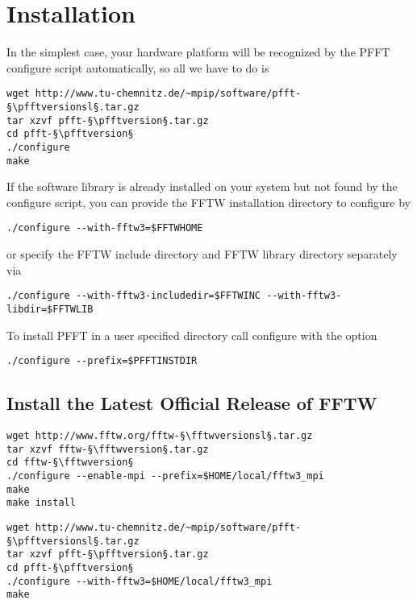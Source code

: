 \chapter{Installation}\label{chap:inst}




In the simplest case, your hardware platform will be recognized by the PFFT configure script automatically,
so all we have to do is
\begin{lstlisting}[escapechar=§]
wget http://www.tu-chemnitz.de/~mpip/software/pfft-§\pfftversionsl§.tar.gz
tar xzvf pfft-§\pfftversion§.tar.gz
cd pfft-§\pfftversion§
./configure
make
\end{lstlisting}

If the \fftw\fftwversion{} software library is already installed on your system but not found by the configure script,
you can provide the FFTW installation directory  to configure by
\begin{lstlisting}
./configure --with-fftw3=$FFTWHOME
\end{lstlisting}
or specify the FFTW include directory  and FFTW library directory  separately via
\begin{lstlisting}
./configure --with-fftw3-includedir=$FFTWINC --with-fftw3-libdir=$FFTWLIB
\end{lstlisting}
To install PFFT in a user specified directory  call configure with the option
\begin{lstlisting}
./configure --prefix=$PFFTINSTDIR
\end{lstlisting}


\section{Install the Latest Official Release of FFTW}

\begin{lstlisting}[escapechar=§]
wget http://www.fftw.org/fftw-§\fftwversionsl§.tar.gz
tar xzvf fftw-§\fftwversion§.tar.gz
cd fftw-§\fftwversion§
./configure --enable-mpi --prefix=$HOME/local/fftw3_mpi
make
make install
\end{lstlisting}

\begin{lstlisting}[escapechar=§]
wget http://www.tu-chemnitz.de/~mpip/software/pfft-§\pfftversionsl§.tar.gz
tar xzvf pfft-§\pfftversion§.tar.gz
cd pfft-§\pfftversion§
./configure --with-fftw3=$HOME/local/fftw3_mpi
make
\end{lstlisting}




